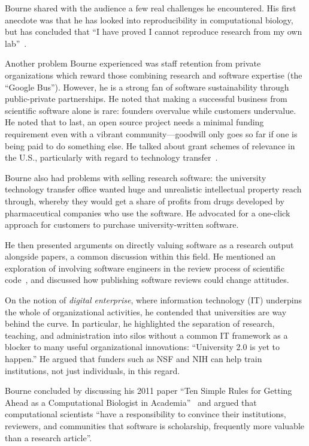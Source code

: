 \documentclass[11pt, oneside]{amsart}
\begin{document}
Bourne shared with the audience a few real challenges he
encountered. His first anecdote was that he has looked into
reproducibility in computational biology, but has concluded that ``I
have proved I cannot reproduce research from my own
lab''~\cite{Veretnik}.

Another problem Bourne experienced was staff retention from
private organizations which reward those combining research and
software expertise (the ``Google Bus''). However, he is a strong fan
of software sustainability through public-private partnerships. He
noted that making a successful business from scientific software alone
is  rare: founders overvalue while customers undervalue. He noted
that to last, an open source project needs a minimal funding
requirement even with a vibrant community---goodwill only goes so
far if one is being paid to do something else.  He talked about grant
schemes of relevance in the U.S., particularly with regard to
technology transfer~\cite{sbir-web, fased-web}.

Bourne also had problems with selling research software: the university technology
transfer office wanted huge and unrealistic intellectual property
reach through, whereby they would get a share of profits from drugs
developed by pharmaceutical companies who use the software.
He advocated for  a one-click approach for customers to
purchase university-written software.

He then presented arguments on directly valuing software as
a research output alongside papers, a common discussion within this field.
He mentioned an  exploration of involving software
engineers in the review process of scientific code~\cite{peer-review-code}, and discussed
how publishing software reviews could change attitudes.

On the notion of \emph{digital enterprise}, where information
technology (IT) underpins the whole of organizational activities, he
contended that universities are way behind the curve. In
particular, he highlighted the separation of research, teaching, and
administration into silos without a common IT framework as a blocker
to many useful organizational innovations: ``University 2.0 is yet to
happen.''  He argued that
funders such as NSF and NIH can help train institutions, not just individuals, in this regard.

Bourne concluded by discussing his 2011 paper ``Ten Simple Rules for Getting Ahead as a Computational Biologist in Academia''~\cite{bourne_ten} and
argued that computational scientists ``have a responsibility to
convince their institutions, reviewers, and communities that software is
scholarship, frequently
more valuable than a research article''.
\end{document}

